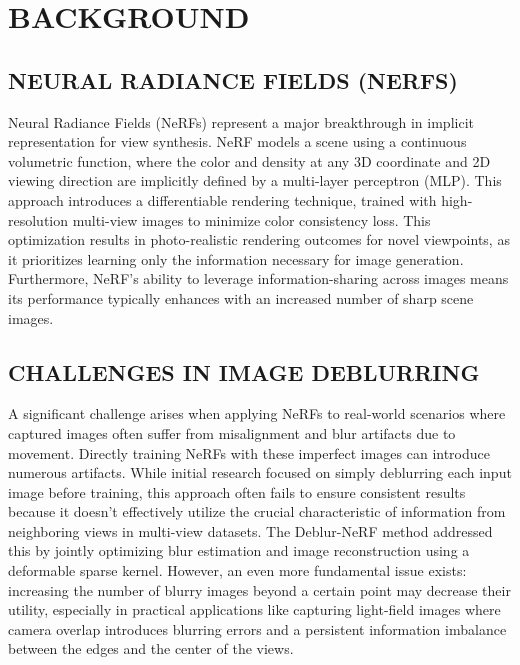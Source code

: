 \chapter{\MakeUppercase{Background}}
\setcounter{equation}{0}

\section{\MakeUppercase{Neural Radiance Fields (NeRFs)}}

Neural Radiance Fields (NeRFs) represent a major breakthrough in implicit representation for view synthesis. NeRF models a scene using a continuous volumetric function, where the color and density at any 3D coordinate and 2D viewing direction are implicitly defined by a multi-layer perceptron (MLP). This approach introduces a differentiable rendering technique, trained with high-resolution multi-view images to minimize color consistency loss. This optimization results in photo-realistic rendering outcomes for novel viewpoints, as it prioritizes learning only the information necessary for image generation. Furthermore, NeRF's ability to leverage information-sharing across images means its performance typically enhances with an increased number of sharp scene images.

\section{\MakeUppercase{Challenges in Image Deblurring}}

A significant challenge arises when applying NeRFs to real-world scenarios where captured images often suffer from misalignment and blur artifacts due to movement. Directly training NeRFs with these imperfect images can introduce numerous artifacts. While initial research focused on simply deblurring each input image before training, this approach often fails to ensure consistent results because it doesn't effectively utilize the crucial characteristic of information from neighboring views in multi-view datasets. The Deblur-NeRF method addressed this by jointly optimizing blur estimation and image reconstruction using a deformable sparse kernel. However, an even more fundamental issue exists: increasing the number of blurry images beyond a certain point may decrease their utility, especially in practical applications like capturing light-field images where camera overlap introduces blurring errors and a persistent information imbalance between the edges and the center of the views.\cite{bib3}


